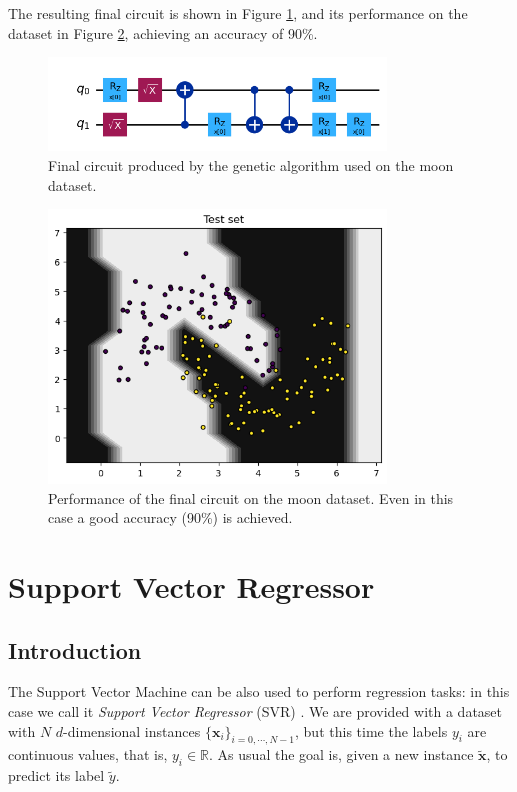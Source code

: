 \documentclass[12pt]{article}
\begin{document}
The resulting final circuit is shown in Figure \ref{fig:mooncircuit}, and its performance on the dataset in Figure \ref{fig:moonboh}, achieving an accuracy of 90\%. 
\begin{figure}[h!]
    \centering
    \includegraphics[width=0.8\textwidth]{images/mooncircuit.png}
    \caption{Final circuit produced by the genetic algorithm used on the moon dataset.}
    \label{fig:mooncircuit}
\end{figure}\begin{figure}[h!]
    \centering
    \includegraphics[width=0.8\textwidth]{images/moonboh.png}
    \caption{Performance of the final circuit on the moon dataset. Even in this case a good accuracy (90\%) is achieved.}
    \label{fig:moonboh}
\end{figure}
\newpage
\section{Support Vector Regressor}
\subsection{Introduction}
The Support Vector Machine can be also used to perform regression tasks: in this case we call it \textit{Support Vector Regressor} (SVR) \cite{drucker}. We are provided with a dataset with $N$ $d$-dimensional instances $\{\mathbf{x}_i\}_{i=0,\cdots, N-1}$, but this time the labels $y_i$ are continuous values, that is, $y_i\in \mathbb{R}$. As usual the goal is, given a new instance $\tilde{\mathbf{x}}$, to predict its label $\tilde{y}$. 
\end{document}
